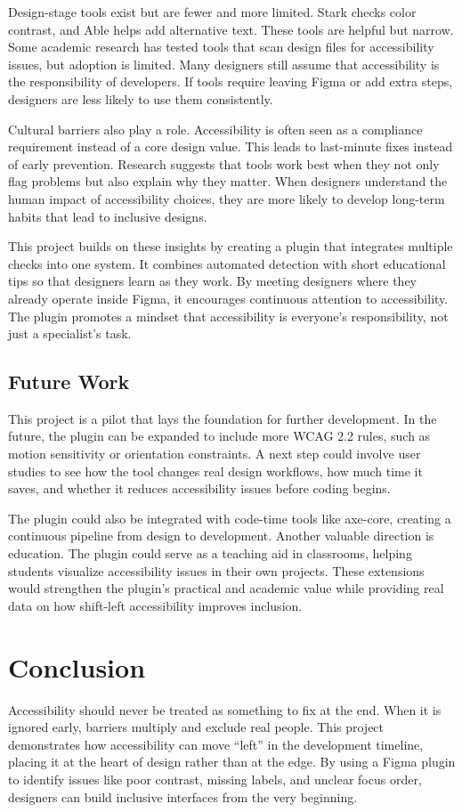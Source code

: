 \documentclass[12pt]{article}
\begin{document}
Design-stage tools exist but are fewer and more limited. Stark checks color contrast, and Able helps
add alternative text. These tools are helpful but narrow. Some academic research has tested tools that
scan design files for accessibility issues, but adoption is limited. Many designers still assume that
accessibility is the responsibility of developers. If tools require leaving Figma or add extra steps, designers
are less likely to use them consistently.

Cultural barriers also play a role. Accessibility is often seen as a compliance requirement instead of a
core design value. This leads to last-minute fixes instead of early prevention. Research suggests that
tools work best when they not only flag problems but also explain why they matter. When designers
understand the human impact of accessibility choices, they are more likely to develop long-term habits
that lead to inclusive designs.

This project builds on these insights by creating a plugin that integrates multiple checks into one system.
It combines automated detection with short educational tips so that designers learn as they work. By
meeting designers where they already operate inside Figma, it encourages continuous attention to
accessibility. The plugin promotes a mindset that accessibility is everyone’s responsibility, not just a
specialist’s task.

\subsection{Future Work}
This project is a pilot that lays the foundation for further development. In the future, the plugin can be
expanded to include more WCAG 2.2 rules, such as motion sensitivity or orientation constraints. A next
step could involve user studies to see how the tool changes real design workflows, how much time it
saves, and whether it reduces accessibility issues before coding begins.

The plugin could also be integrated with code-time tools like axe-core, creating a continuous pipeline
from design to development. Another valuable direction is education. The plugin could serve as a
teaching aid in classrooms, helping students visualize accessibility issues in their own projects. These
extensions would strengthen the plugin’s practical and academic value while providing real data on how
shift-left accessibility improves inclusion.

\section{Conclusion}
Accessibility should never be treated as something to fix at the end. When it is ignored early, barriers
multiply and exclude real people. This project demonstrates how accessibility can move “left” in the
development timeline, placing it at the heart of design rather than at the edge. By using a Figma plugin
to identify issues like poor contrast, missing labels, and unclear focus order, designers can build inclusive
interfaces from the very beginning.
\end{document}
